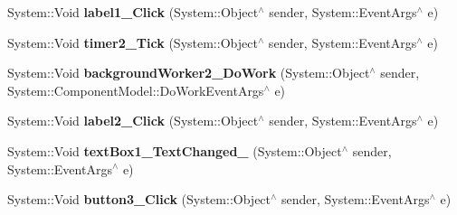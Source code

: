 \begin{DoxyCompactItemize}
System\+::\+Void {\bfseries label1\+\_\+\+Click} (System\+::\+Object$^\wedge$ sender, System\+::\+Event\+Args$^\wedge$ e)
\item 
\mbox{\label{class_glasses_1_1_my_form_ae115493e2063e18eb3756ca31584b8cb}} 
System\+::\+Void {\bfseries timer2\+\_\+\+Tick} (System\+::\+Object$^\wedge$ sender, System\+::\+Event\+Args$^\wedge$ e)
\item 
\mbox{\label{class_glasses_1_1_my_form_aebf5ff96e21495693b05da86787674d1}} 
System\+::\+Void {\bfseries background\+Worker2\+\_\+\+Do\+Work} (System\+::\+Object$^\wedge$ sender, System\+::\+Component\+Model\+::\+Do\+Work\+Event\+Args$^\wedge$ e)
\item 
\mbox{\label{class_glasses_1_1_my_form_a111fb8e052230d40b166756f161ac1b5}} 
System\+::\+Void {\bfseries label2\+\_\+\+Click} (System\+::\+Object$^\wedge$ sender, System\+::\+Event\+Args$^\wedge$ e)
\item 
\mbox{\label{class_glasses_1_1_my_form_a2119b7b9f9ae872c2b4a5bcc35a51482}} 
System\+::\+Void {\bfseries text\+Box1\+\_\+\+Text\+Changed\+\_} (System\+::\+Object$^\wedge$ sender, System\+::\+Event\+Args$^\wedge$ e)
\item 
\mbox{\label{class_glasses_1_1_my_form_a6672d495dcf6c2f793d11d4588075b8d}} 
System\+::\+Void {\bfseries button3\+\_\+\+Click} (System\+::\+Object$^\wedge$ sender, System\+::\+Event\+Args$^\wedge$ e)
\end{DoxyCompactItemize}
